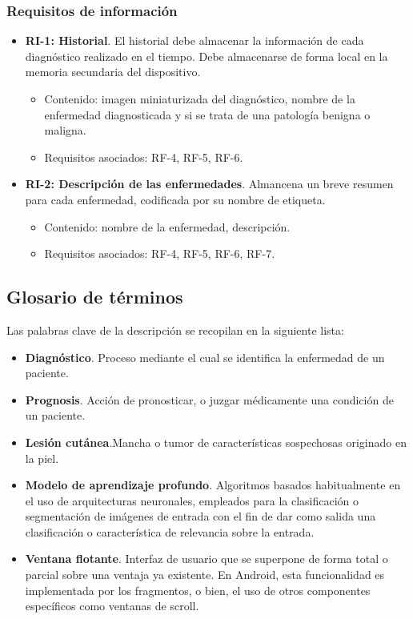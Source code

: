 \subsubsection{Requisitos de información}

\begin{itemize}
	 \item \textbf{RI-1: Historial}. El historial debe almacenar la información de cada diagnóstico realizado en el tiempo. Debe almacenarse de forma local en la memoria secundaria del dispositivo.
	 \begin{itemize}
	 	\item Contenido: imagen miniaturizada del diagnóstico, nombre de la enfermedad diagnosticada y si se trata de una patología benigna o maligna. 
	 	\item Requisitos asociados: RF-4, RF-5, RF-6.
	 \end{itemize}
	\item  \textbf{RI-2: Descripción de las enfermedades}. Almancena un breve resumen para cada enfermedad, codificada por su nombre de etiqueta.
		 \begin{itemize}
		\item Contenido: nombre de la enfermedad, descripción.
		\item Requisitos asociados: RF-4, RF-5, RF-6, RF-7.
	\end{itemize}
\end{itemize}

\subsection{Glosario de términos}
Las palabras clave de la descripción se recopilan en la siguiente lista:
\begin{itemize}
	\item \textbf{Diagnóstico}. Proceso mediante el cual se identifica la enfermedad de un paciente.
	\item \textbf{ Prognosis}. Acción de pronosticar, o juzgar médicamente una condición de un paciente.
	\item  \textbf{Lesión cutánea}.Mancha o tumor de características sospechosas originado en la piel.
	\item  \textbf{Modelo de aprendizaje profundo}. Algoritmos basados habitualmente en el uso de arquitecturas neuronales, empleados para la clasificación o segmentación de imágenes de entrada con el fin de dar como salida una clasificación o característica de relevancia sobre la entrada.
	\item  \textbf{Ventana flotante}. Interfaz de usuario que se superpone de forma total o parcial sobre una ventaja ya existente. En Android, esta funcionalidad es implementada por los fragmentos, o bien, el uso de otros componentes específicos como ventanas de scroll.
\end{itemize}

